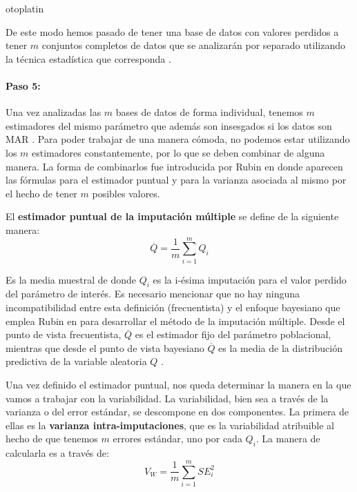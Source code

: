 otoplatin\documentclass[a4paper,openright,12pt]{report}
\begin{document}
De este modo hemos pasado de tener una base de datos con valores perdidos a tener $m$ conjuntos completos de datos que se analizarán por separado utilizando la técnica estadística que corresponda \cite{Rubin1978_3}.

\paragraph{Paso 5:}

Una vez analizadas las $m$ bases de datos de forma individual, tenemos $m$ estimadores del mismo parámetro que además son insesgados si los datos son MAR \cite{VanBuuren2012}. Para poder trabajar de una manera cómoda, no podemos estar utilizando los $m$ estimadores constantemente, por lo que se deben combinar de alguna manera. La forma de combinarlos fue introducida por Rubin en \cite{Rubin1987} donde aparecen las fórmulas para el estimador puntual y para la varianza asociada al mismo por el hecho de tener $m$ posibles valores. 

El \textbf{estimador puntual de la imputación múltiple} se define de la siguiente manera:
\begin{equation}
\overline{Q}=\frac{1}{m}\sum_{i=1}^{m}Q_{i}
\label{estimador_puntual_imputacion multiple}
\end{equation}

Es la media muestral de donde $Q_{i}$ es la i-ésima imputación para el valor perdido del parámetro de interés. Es necesario mencionar que no hay ninguna incompatibilidad entre esta definición (frecuentista) y el enfoque bayesiano que emplea Rubin en \cite{Rubin1987} para desarrollar el método de la imputación múltiple. Desde el punto de vista frecuentista, $\overline{Q}$ es el estimador fijo del parámetro poblacional, mientras que desde el punto de vista bayesiano $\overline{Q}$ es la media de la distribución predictiva de la variable aleatoria $Q$  \cite{VanBuuren2012}.

Una vez definido el estimador puntual, nos queda determinar la manera en la que vamos a trabajar con la variabilidad. La variabilidad, bien sea a través de la varianza o del error estándar, se descompone en dos componentes. La primera de ellas es la \textbf{varianza intra-imputaciones}, que es la variabilidad atribuible al hecho de que tenemos $m$ errores estándar, uno por cada $Q_{i}$. La manera de calcularla es a través de:
\begin{equation}
V_{W}=\frac{1}{m}\sum_{i=1}^{m}SE_{i}^{2}
\label{within_var_est_puntual}
\end{equation}
\end{document}
